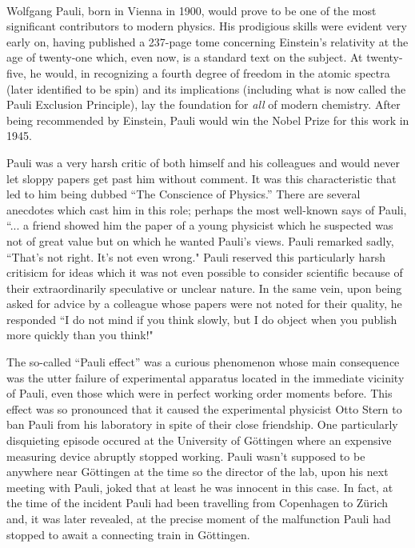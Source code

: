 \documentclass[12pt]{book}
\begin{document}
\paragraph*{}Wolfgang Pauli, born in Vienna in 1900, would prove to be one of the most significant contributors to modern physics. His prodigious skills were evident very early on, having published a 237-page tome concerning Einstein's relativity at the age of twenty-one which, even now, is a standard text on the subject. At twenty-five, he would, in recognizing a fourth degree of freedom in the atomic spectra (later identified to be spin) and its implications (including what is now called the Pauli Exclusion Principle), lay the foundation for \emph{all} of modern chemistry. After being recommended by Einstein, Pauli would win the Nobel Prize for this work in 1945.

Pauli was a very harsh critic of both himself and his colleagues and would never let sloppy papers get past him without comment. It was this characteristic that led to him being dubbed ``The Conscience of Physics.'' There are several anecdotes which cast him in this role; perhaps the most well-known says of Pauli, ``... a friend showed him the paper of a young physicist which he suspected was not of great value but on which he wanted Pauli's views. Pauli remarked sadly, ``That's not right. It's not even wrong.\cite{peierls}" Pauli reserved this particularly harsh critisicm for ideas which it was not even possible to consider scientific because of their extraordinarily speculative or unclear nature. In the same vein, upon being asked for advice by a colleague whose papers were not noted for their quality, he responded ``I do not mind if you think slowly, but I do object when you publish more quickly than you think!\cite{cropper}"

The so-called ``Pauli effect'' was a curious phenomenon whose main consequence was the utter failure of  experimental apparatus located in the immediate vicinity of Pauli, even those which were in perfect working order moments before. This effect was so pronounced that it caused the experimental physicist Otto Stern to ban Pauli from his laboratory in spite of their close friendship. One particularly disquieting episode occured at the University of G\"{o}ttingen where an expensive measuring device abruptly stopped working. Pauli wasn't supposed to be anywhere near G\"{o}ttingen at the time so the director of the lab, upon his next meeting with Pauli, joked that at least he was innocent in this case. In fact, at the time of the incident Pauli had been travelling from Copenhagen to Z\"{u}rich and, it was later revealed, at the precise moment of the malfunction Pauli had stopped to await a connecting train in G\"{o}ttingen\cite{enz}.
\end{document}
